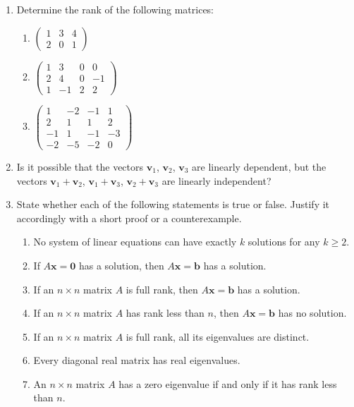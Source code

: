 \documentclass[11pt,letterpaper]{scrartcl}
\begin{document}
\begin{enumerate}
	\item Determine the rank of the following matrices:
	\begin{enumerate}
	\item $\left(\begin{array}{ccc}
	1 & 3 & 4\\
	2 & 0 & 1
	\end{array}\right)$
	\item $\left(\begin{array}{cccc}
	1 & 3 & 0 & 0\\
	2 & 4 & 0 & -1\\
	1 & -1 & 2 & 2
	\end{array}\right)$
	\item $\left(\begin{array}{cccc}
	1 & -2 & -1 & 1\\
	2 & 1 & 1 & 2\\
	-1 & 1 & -1 & -3\\
	-2 & -5 & -2 & 0
	\end{array}\right)$
	\end{enumerate}

	\item Is it possible that the vectors $\mathbf{v}_{1}$, $\mathbf{v}_{2}$,
	$\mathbf{v}_{3}$ are linearly dependent, but the vectors $\mathbf{v}_{1}+\mathbf{v}_{2}$,
	$\mathbf{v}_{1}+\mathbf{v}_{3}$, $\mathbf{v}_{2}+\mathbf{v}_{3}$
	are linearly independent?

	\item State whether each of the following statements is true or false. Justify it accordingly with a short proof or a counterexample.
		\begin{enumerate}
		\item No system of linear equations can have exactly $k$ solutions for
		any $k\geq2$.
		\item If $A\mathbf{x}=\mathbf{0}$ has a solution, then $A\mathbf{x}=\mathbf{b}$
		has a solution.
		\item If an $n\times n$ matrix $A$ is full rank, then $A\mathbf{x}=\mathbf{b}$
		has a solution.
		\item If an $n\times n$ matrix $A$ has rank less than $n$, then $A\mathbf{x}=\mathbf{b}$
		has no solution.
		\item If an $n\times n$ matrix $A$ is full rank, all its eigenvalues are
		distinct.
		\item Every diagonal real matrix has real eigenvalues.
		\item An $n\times n$ matrix $A$ has a zero eigenvalue if and only if it
		has rank less than $n$.
		\end{enumerate}


\end{enumerate}
\end{document}
